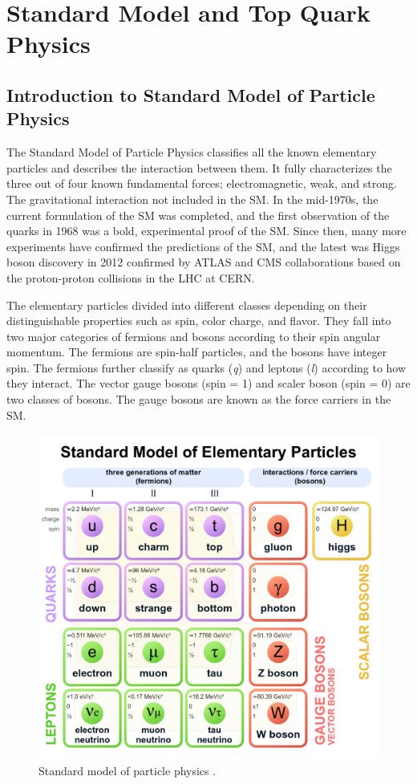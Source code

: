 \chapter{Standard Model and Top Quark Physics}
\label{Chapter2}
\section{Introduction to Standard Model of Particle Physics}
\label{SM}
The Standard Model of Particle Physics classifies all the known elementary particles and describes the interaction between them. It fully characterizes the three out of four known fundamental forces; electromagnetic, weak, and strong. The gravitational interaction not included in the SM. In the mid-1970s, the current formulation of the SM was completed, and the first observation of the quarks in 1968 was a bold, experimental proof of the SM. Since then, many more experiments have confirmed the predictions of the SM, and the latest was Higgs boson discovery in 2012 confirmed by ATLAS \cite{20121} and CMS \cite{201230} collaborations based on the proton-proton collisions in the LHC at CERN.

The elementary particles divided into different classes depending on their distinguishable properties such as spin, color charge, and flavor. They fall into two major categories of fermions and bosons according to their spin angular momentum. The fermions are spin-half particles, and the bosons have integer spin. The fermions further classify as quarks (\textit{q}) and leptons (\textit{l}) according to how they interact. The vector gauge bosons (spin = 1) and scaler boson (spin = 0) are two classes of bosons. The gauge bosons are known as the force carriers in the SM.

\begin{figure}
\centering
\includegraphics[scale=0.25]{Figures/StandardModel}
\decoRule
\caption{Standard model of particle physics \cite{SMwiki}.}
\label{fig:StandardModel}
\end{figure}

